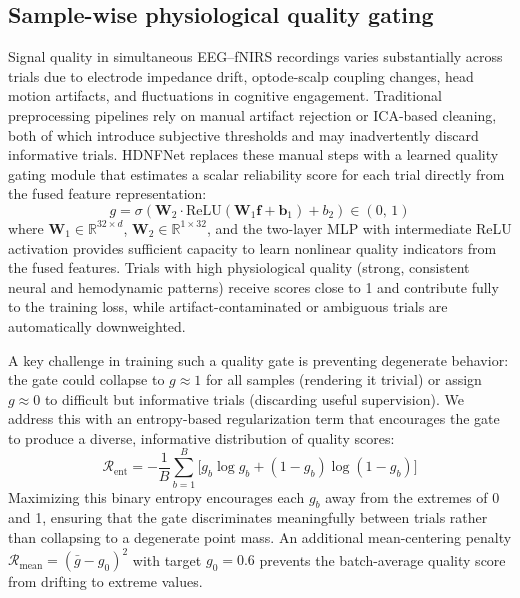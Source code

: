 \documentclass[preprint,12pt,authoryear]{elsarticle}
\begin{document}
\subsection{Sample-wise physiological quality gating}
\label{sec:quality_gating}

Signal quality in simultaneous EEG--fNIRS recordings varies substantially across trials due to electrode impedance drift, optode-scalp coupling changes, head motion artifacts, and fluctuations in cognitive engagement. Traditional preprocessing pipelines rely on manual artifact rejection or ICA-based cleaning, both of which introduce subjective thresholds and may inadvertently discard informative trials. HDNFNet replaces these manual steps with a learned quality gating module that estimates a scalar reliability score for each trial directly from the fused feature representation:
\begin{equation}
\label{eq:quality_gate}
g = \sigma\!\left(\mathbf{W}_2 \cdot \mathrm{ReLU}\!\left(\mathbf{W}_1 \mathbf{f} + \mathbf{b}_1\right) + b_2\right) \in (0,\, 1)
\end{equation}
where $\mathbf{W}_1 \in \mathbb{R}^{32 \times d}$, $\mathbf{W}_2 \in \mathbb{R}^{1 \times 32}$, and the two-layer MLP with intermediate ReLU activation provides sufficient capacity to learn nonlinear quality indicators from the fused features. Trials with high physiological quality (strong, consistent neural and hemodynamic patterns) receive scores close to 1 and contribute fully to the training loss, while artifact-contaminated or ambiguous trials are automatically downweighted.

A key challenge in training such a quality gate is preventing degenerate behavior: the gate could collapse to $g \approx 1$ for all samples (rendering it trivial) or assign $g \approx 0$ to difficult but informative trials (discarding useful supervision). We address this with an entropy-based regularization term that encourages the gate to produce a diverse, informative distribution of quality scores:
\begin{equation}
\label{eq:entropy_reg}
\mathcal{R}_{\mathrm{ent}} = -\frac{1}{B}\sum_{b=1}^{B}\bigl[g_b \log g_b + (1 - g_b) \log(1 - g_b)\bigr]
\end{equation}
Maximizing this binary entropy encourages each $g_b$ away from the extremes of 0 and 1, ensuring that the gate discriminates meaningfully between trials rather than collapsing to a degenerate point mass. An additional mean-centering penalty $\mathcal{R}_{\mathrm{mean}} = (\bar{g} - g_0)^2$ with target $g_0 = 0.6$ prevents the batch-average quality score from drifting to extreme values.
\end{document}
